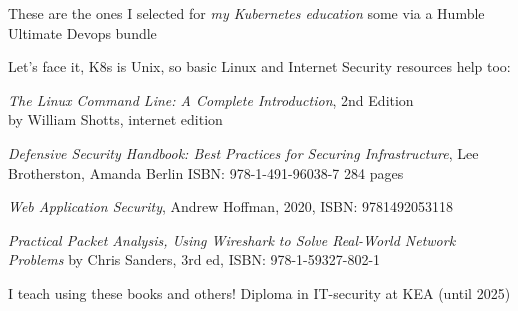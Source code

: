 \documentclass[Screen16to9,17pt]{foils}
\begin{document}
These are the ones I selected for \emph{my Kubernetes education} some via a Humble Ultimate Devops bundle


Let's face it, K8s is Unix, so basic Linux and Internet Security resources help too:
\begin{list2}
\item \emph{The Linux Command Line: A Complete Introduction}, 2nd Edition\\
 by William Shotts, internet edition 
\item \emph{Defensive Security Handbook: Best Practices for Securing Infrastructure}, Lee Brotherston, Amanda Berlin ISBN: 978-1-491-96038-7 284 pages
\item \emph{Web Application Security}, Andrew Hoffman, 2020, ISBN: 9781492053118
\item \emph{Practical Packet Analysis, Using Wireshark to Solve Real-World Network Problems}
by Chris Sanders, 3rd ed, ISBN: 978-1-59327-802-1
\end{list2}

I teach using these books and others! Diploma in IT-security at KEA (until 2025)\\
\end{document}
